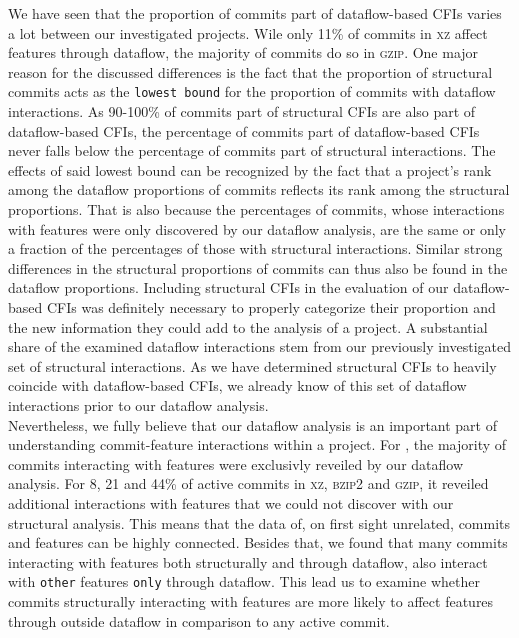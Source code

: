 We have seen that the proportion of commits part of dataflow-based CFIs varies a lot between our investigated projects.
Wile only 11\% of commits in \textsc{xz} affect features through dataflow, the majority of commits do so in \textsc{gzip}.
One major reason for the discussed differences is the fact that the proportion of structural commits acts as the \texttt{lowest bound} for the proportion of commits with dataflow interactions.
As 90-100\% of commits part of structural CFIs are also part of dataflow-based CFIs, the percentage of commits part of dataflow-based CFIs never falls below the percentage of commits part of structural interactions.
The effects of said lowest bound can be recognized by the fact that a project's rank among the dataflow proportions of commits reflects its rank among the structural proportions.
That is also because the percentages of commits, whose interactions with features were only discovered by our dataflow analysis, are the same or only a fraction of the percentages of those with structural interactions.
Similar strong differences in the structural proportions of commits can thus also be found in the dataflow proportions.
Including structural CFIs in the evaluation of our dataflow-based CFIs was definitely necessary to properly categorize their proportion and the new information they could add to the analysis of a project.
A substantial share of the examined dataflow interactions stem from our previously investigated set of structural interactions.
As we have determined structural CFIs to heavily coincide with dataflow-based CFIs, we already know of this set of dataflow interactions prior to our dataflow analysis. \\
Nevertheless, we fully believe that our dataflow analysis is an important part of understanding commit-feature interactions within a project.
For , the majority of commits interacting with features were exclusivly reveiled by our dataflow analysis.
For 8, 21 and 44\% of active commits in \textsc{xz}, \textsc{bzip2} and \textsc{gzip}, it reveiled additional interactions with features that we could not discover with our structural analysis.
This means that the data of, on first sight unrelated, commits and features can be highly connected. 
Besides that, we found that many commits interacting with features both structurally and through dataflow, also interact with \texttt{other} features \texttt{only} through dataflow.
This lead us to examine whether commits structurally interacting with features are more likely to affect features through outside dataflow in comparison to any active commit.
